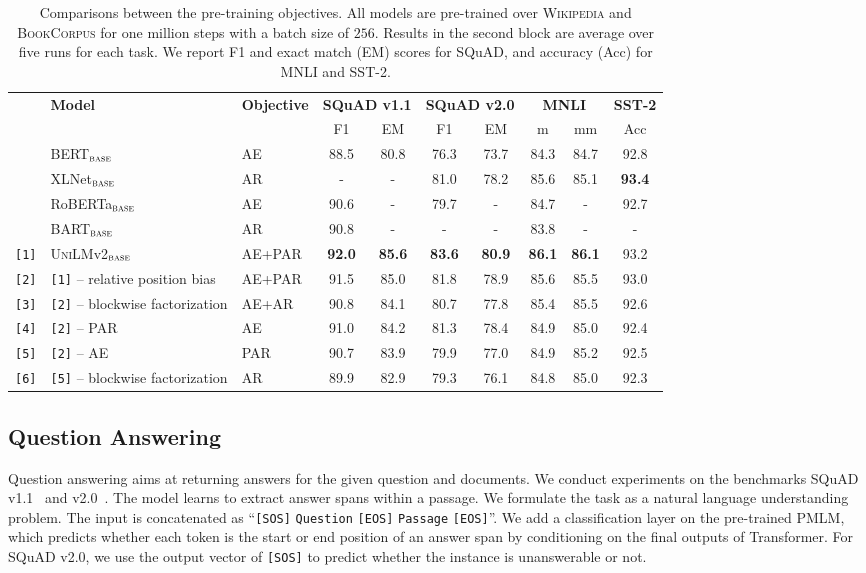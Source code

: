 \documentclass{article}
\newcommand\pmlm{\textsc{PMLM}}
\newcommand{\bertbase}{BERT$_{\textsc{base}}$}
\newcommand{\bartbase}{BART$_{\textsc{base}}$}
\newcommand{\xlnetbase}{XLNet$_{\textsc{base}}$}
\newcommand{\robertabase}{RoBERTa$_{\textsc{base}}$}
\newcommand{\vtwobase}{\textsc{UniLM}v2$_{\textsc{base}}$}
\newcommand\norelposfull{-- relative position bias}
\newcommand{\sptk}[1]{\texttt{[#1]}}
\newcommand{\tblidx}[1]{{\small \texttt{[#1]}}}
\begin{document}
\begin{table*}[t]
\centering
\begin{tabular}{lllccccccc}
\toprule
& \multirow{2}{*}{\bf Model} & \multirow{2}{*}{\bf Objective} & \multicolumn{2}{c}{\textbf{SQuAD v1.1}} & \multicolumn{2}{c}{\textbf{SQuAD v2.0}} & \multicolumn{2}{c}{\textbf{MNLI}} & {\bf SST-2} \\
& & & F1 & EM & F1 & EM & m & mm & Acc \\
\midrule
&\bertbase{} & AE & 88.5 & 80.8 & 76.3 & 73.7 & 84.3 & 84.7 & 92.8 \\
&\xlnetbase{} & AR & - & - & 81.0 & 78.2 & 85.6 & 85.1 & \textbf{93.4} \\
&\robertabase{} & AE & 90.6 & - & 79.7 & - & 84.7 & - & 92.7 \\
&\bartbase{} & AR & 90.8 & - & - & - & 83.8 & - & - \\
\midrule
\tblidx{1} &\vtwobase{} & AE+PAR & \textbf{92.0} & \textbf{85.6} & \textbf{83.6} & \textbf{80.9} & \textbf{86.1} & \textbf{86.1} & 93.2  \\
\tblidx{2} &\tblidx{1} \norelposfull & AE+PAR & 91.5 & 85.0 & 81.8 & 78.9 & 85.6 & 85.5 & 93.0 \\
\tblidx{3} &\tblidx{2} -- blockwise factorization & AE+AR & 90.8 & 84.1 & 80.7 & 77.8 & 85.4 & 85.5 & 92.6 \\
\tblidx{4} &\tblidx{2} -- PAR & AE & 91.0 & 84.2 & 81.3 & 78.4 & 84.9 & 85.0 & 92.4 \\
\tblidx{5} &\tblidx{2} -- AE & PAR & 90.7 & 83.9 & 79.9 & 77.0 & 84.9 & 85.2 & 92.5 \\
\tblidx{6} &\tblidx{5} -- blockwise factorization & AR & 89.9 & 82.9 & 79.3 & 76.1 & 84.8 & 85.0 & 92.3 \\
\bottomrule
\end{tabular}
\caption{
Comparisons between the pre-training objectives.
All models are pre-trained over \textsc{Wikipedia} and \textsc{BookCorpus} for one million steps with a batch size of $256$.
Results in the second block are average over five runs for each task.
We report F1 and exact match (EM) scores for SQuAD, and accuracy (Acc) for MNLI and SST-2.
}
\label{tbl:base_1Mstep}
\end{table*}


\subsection{Question Answering}
\label{sec:qa}

Question answering aims at returning answers for the given question and documents.
We conduct experiments on the benchmarks SQuAD v1.1~\cite{squad1} and v2.0~\cite{squad2}.
The model learns to extract answer spans within a passage.
We formulate the task as a natural language understanding problem.
The input is concatenated as ``\sptk{SOS} \texttt{Question} \sptk{EOS} \texttt{Passage} \sptk{EOS}''.
We add a classification layer on the pre-trained \pmlm{}, which predicts whether each token is the start or end position of an answer span by conditioning on the final outputs of Transformer.
For SQuAD v2.0, we use the output vector of \sptk{SOS} to predict whether the instance is unanswerable or not.
\end{document}
